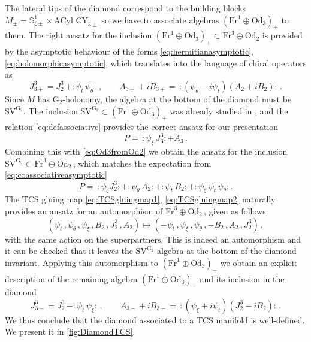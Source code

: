 \documentclass{pspum-l}
\newcommand{\SVseven}{\text{SV}^{\text{G}_2}}
\newcommand{\normord}[1]{:\mathrel{#1}:} %
\newcommand*\Sc{\mathbb{S}}
\theoremstyle{definition}
\theoremstyle{remark}
\numberwithin{equation}{section}
\begin{document}
The lateral tips of the diamond correspond to the building blocks $M_\pm=\Sc^1_{\xi\pm}\times\text{ACyl CY}_{3\pm}$ so we have to associate algebras $\left( \text{Fr}^1\oplus \text{Od}_3 \right)_\pm$ to them. The right ansatz for the inclusion $\left( \text{Fr}^1\oplus \text{Od}_3 \right)_+\subset\text{Fr}^3\oplus \text{Od}_2$ is provided by the asymptotic behaviour of the forms \eqref{eq:hermitianasymptotic}, \eqref{eq:holomorphicasymptotic}, which translates into the language of chiral operators as
\begin{equation}
\label{eq:Od3fromOd2}
    J^3_{3+} = J^3_2 \, + \normord{\psi_t\,\psi_\theta} \, , \qquad A_{3+}+iB_{3+} = \, \normord{(\psi_\theta-i\psi_t)(A_2+iB_2)} \, .
\end{equation}
Since $M$ has G$_2$-holonomy, the algebra at the bottom of the diamond must be $\SVseven$. The inclusion $\SVseven\subset\left( \text{Fr}^1\oplus \text{Od}_3 \right)_+$ was already studied in \cite{Figueroa-OFarrill:1996tnk}, and the relation \eqref{eq:defassociative} provides the correct ansatz for our presentation
\begin{equation}
    P = \, \normord{\psi_\xi\,J^3_3} + A_3 \, .
\end{equation}
Combining this with \eqref{eq:Od3fromOd2} we obtain the ansatz for the inclusion $\SVseven\subset\text{Fr}^3\oplus \text{Od}_2\,$, which matches the expectation from \eqref{eq:coassociativeasymptotic}
\begin{equation}
    P = \, \normord{\psi_\xi J^3_2} + \normord{\psi_\theta\, A_2} +\normord{\psi_t\, B_2} + \normord{\psi_\xi\,\psi_t\,\psi_\theta} .
\end{equation}
The TCS gluing map \eqref{eq:TCSgluingmap1}, \eqref{eq:TCSgluingmap2} naturally provides an ansatz for an automorphism of $\text{Fr}^3\oplus \text{Od}_2\,$, given as follows:
\begin{equation}
\label{eq:TCSgluingalgebra}
    \left( \psi_t \, , \psi_\theta \, , \psi_\xi \, , B_2 \, , J^3_2 \, , A_2 \right) \longmapsto \left( -\psi_t \, , \psi_\xi \, , \psi_\theta \, , -B_2 \, , A_2 \, , J^3_2 \right) \, ,
\end{equation}
with the same action on the superpartners. This is indeed an automorphism and it can be checked that it leaves the $\SVseven$ algebra at the bottom of the diamond invariant. Applying this automorphism to $\left( \text{Fr}^1\oplus \text{Od}_3 \right)_+$ we obtain an explicit description of the remaining algebra $\left( \text{Fr}^1\oplus \text{Od}_3 \right)_-$ and its inclusion in the diamond
\begin{equation}
    J^3_{3-} = J^3_2 \, - \normord{\psi_t\,\psi_\xi} \, , \qquad A_{3-}+iB_{3-} = \, \normord{(\psi_\xi+i\psi_t)(J^3_2-iB_2)} \, .
\end{equation}
We thus conclude that the diamond associated to a TCS manifold is well-defined. We present it in \cref{fig:DiamondTCS}.
\end{document}
